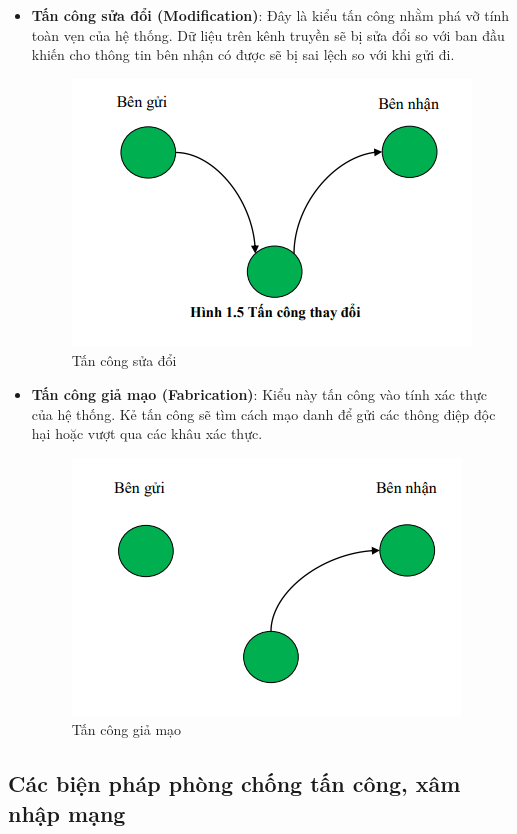 \begin{itemize}
\begin{figure}[H]
    \end{figure}
    \item \textbf{Tấn công sửa đổi (Modification)}: Đây là kiểu tấn công nhằm phá vỡ tính toàn vẹn của hệ thống. Dữ liệu trên kênh truyền sẽ bị sửa đổi so với ban đầu khiến cho thông tin bên nhận có được sẽ bị sai lệch so với khi gửi đi.
    \begin{figure}[H]
        \centering
        \includegraphics{modification}
        \caption{Tấn công sửa đổi}
         
    \end{figure}
    \item \textbf{Tấn công giả mạo (Fabrication)}: Kiểu này tấn công vào tính xác thực của hệ thống. Kẻ tấn công sẽ tìm cách mạo danh để gửi các thông điệp độc hại hoặc vượt qua các khâu xác thực. 
    \begin{figure}[H]
        \centering
        \includegraphics{fabrication}
        \caption{Tấn công giả mạo}
         
    \end{figure}
\end{itemize}
\subsection{Các biện pháp phòng chống tấn công, xâm nhập mạng}
